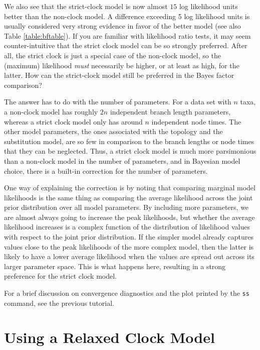 \documentclass[12pt]{book}
\newcommand{\ttt}[1]{\texttt{#1}}
\begin{document}
We also see that the strict-clock model is now almost $15$ log likelihood units better than the
non-clock model. A difference exceeding 5 log likelihood units is usually considered very strong
evidence in favor of the better model \citep{kass95} (see also Table \ref{table:bftable}). If you
are familiar with likelihood ratio tests, it may seem counter-intuitive that the strict clock model
can be so strongly preferred. After all, the strict clock is just a special case of the non-clock
model, so the (maximum) likelihood \emph{must} necessarily be higher, or at least as high, for the
latter. How can the strict-clock model still be preferred in the Bayes factor comparison?

The answer has to do with the number of parameters. For a data set with $n$ taxa, a non-clock model
has roughly $2n$ independent branch length parameters, whereas a strict clock model only has around
$n$ independent node times. The other model parameters, the ones associated with the topology and
the substitution model, are so few in comparison to the branch lengths or node times that they can
be neglected. Thus, a strict clock model is much more parsimonious than a non-clock model in the
number of parameters, and in Bayesian model choice, there is a built-in correction for the number
of parameters.

One way of explaining the correction is by noting that comparing marginal model likelihoods is the
same thing as comparing the average likelihood across the joint prior distribution over all model
parameters. By including more parameters, we are almost always going to increase the peak
likelihoods, but whether the average likelihood increases is a complex function of the distribution
of likelihood values with respect to the joint prior distribution. If the simpler model already
captures values close to the peak likelihoods of the more complex model, then the latter is likely
to have a lower average likelihood when the values are spread out across its larger parameter
space. This is what happens here, resulting in a strong preference for the strict clock model.

For a brief discussion on convergence diagnostics and the plot printed by the \ttt{ss} command,
see the previous tutorial.


\section{Using a Relaxed Clock Model}
\label{relaxedClock}
\end{document}
